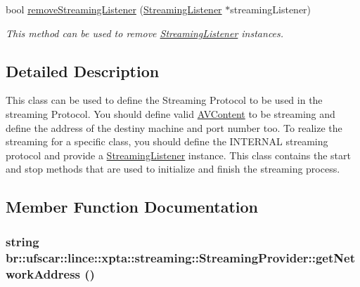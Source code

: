 \begin{DoxyCompactItemize}
bool \hyperlink{classbr_1_1ufscar_1_1lince_1_1xpta_1_1streaming_1_1StreamingProvider_a025cbecf87db14f39b0601ea19005c3f}{removeStreamingListener} (\hyperlink{classbr_1_1ufscar_1_1lince_1_1xpta_1_1streaming_1_1StreamingListener}{StreamingListener} $\ast$streamingListener)
\begin{DoxyCompactList}\small\item\em This method can be used to remove \hyperlink{classbr_1_1ufscar_1_1lince_1_1xpta_1_1streaming_1_1StreamingListener}{StreamingListener} instances. \item\end{DoxyCompactList}\end{DoxyCompactItemize}


\subsection{Detailed Description}
This class can be used to define the Streaming Protocol to be used in the streaming Protocol. You should define valid \hyperlink{classbr_1_1ufscar_1_1lince_1_1xpta_1_1streaming_1_1AVContent}{AVContent} to be streaming and define the address of the destiny machine and port number too. To realize the streaming for a specific class, you should define the INTERNAL streaming protocol and provide a \hyperlink{classbr_1_1ufscar_1_1lince_1_1xpta_1_1streaming_1_1StreamingListener}{StreamingListener} instance. This class contains the start and stop methods that are used to initialize and finish the streaming process. 

\subsection{Member Function Documentation}
\hypertarget{classbr_1_1ufscar_1_1lince_1_1xpta_1_1streaming_1_1StreamingProvider_afc775d9f2e59a95f2b7f6174b0dfaec7}{
\subsubsection[{getNetworkAddress}]{\setlength{\rightskip}{0pt plus 5cm}string br::ufscar::lince::xpta::streaming::StreamingProvider::getNetworkAddress ()}}
\label{classbr_1_1ufscar_1_1lince_1_1xpta_1_1streaming_1_1StreamingProvider_afc775d9f2e59a95f2b7f6174b0dfaec7}


